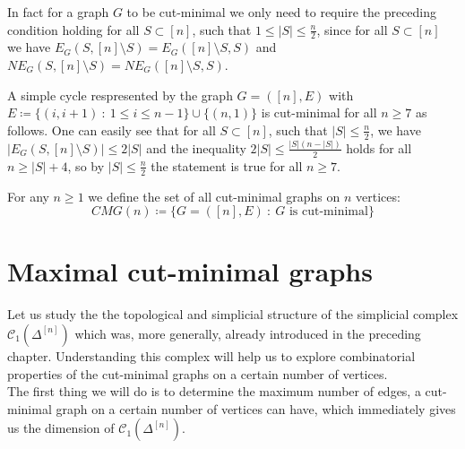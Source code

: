\begin{rem}\label{remark1}
In fact for a graph \(G\) to be cut-minimal we only need to require the preceding condition holding for all \(S\subset [n]\), such that \(1\leq|S|\leq\frac{n}{2}\), since for all \(S\subset [n]\) we have \(E_G(S,[n]\setminus S)=E_G([n]\setminus S,S)\) and \(NE_G(S,[n]\setminus S)=NE_G([n]\setminus S,S)\).
\end{rem}

\begin{expl}
A simple cycle respresented by the graph \(G=([n],E)\) with\\
\(E\coloneqq \{(i,i+1)\: :\: 1\leq i\leq n-1\}\cup\{(n,1)\}\) is cut-minimal for all \(n\geq 7\) as follows. One can easily see that for all \(S\subset [n]\), such that \(|S|\leq\frac{n}{2}\), we have \(|E_G(S,[n]\setminus S)|\leq 2|S|\) and the inequality \(2|S|\leq\frac{|S|(n-|S|)}{2}\) holds for all \(n\geq |S|+4\), so by \(|S|\leq\frac{n}{2}\) the statement is true for all \(n\geq 7\).
\end{expl}

\begin{defi}
For any \(n\geq 1\) we define the set of all cut-minimal graphs on \(n\) vertices:
\[
CMG(n)\coloneqq \{G=([n],E)\: :\: G\text{ is cut-minimal}\}
\]
\end{defi}

\section{Maximal cut-minimal graphs}

Let us study the the topological and simplicial structure of the simplicial complex \(\mathcal{C}_1(\Delta^{[n]})\) which was, more generally, already introduced in the preceding chapter. Understanding this complex will help us to explore combinatorial properties of the cut-minimal graphs on a certain number of vertices.\\
The first thing we will do is to determine the maximum number of edges, a cut-minimal graph on a certain number of vertices can have, which immediately gives us the dimension of \(\mathcal{C}_1(\Delta^{[n]})\).

